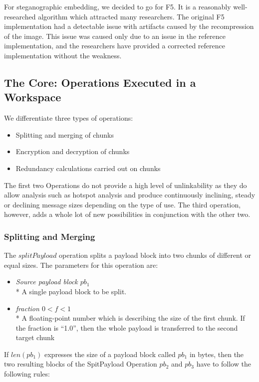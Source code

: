\documentclass[10pt,journal,compsoc,twocolumn,twoside]{IEEEtran}
\begin{document}
For steganographic embedding, we decided to go for F5\cite{f5}. It is a reasonably well-researched algorithm which attracted many researchers. The original F5 implementation had a detectable issue with artifacts\cite{F5broken} caused by the recompression of the image. This issue was caused only due to an issue in the reference implementation, and the researchers have provided a corrected reference implementation without the weakness. %

\subsection{The Core: Operations Executed in a Workspace}
We differentiate three types of operations:
\begin{itemize}
	\item Splitting and merging of chunks
	\item Encryption and decryption of chunks
	\item Redundancy calculations carried out on chunks
\end{itemize}

The first two Operations do not provide a high level of unlinkability as they do allow analysis such as hotspot analysis and produce continuously inclining, steady or declining message sizes depending on the type of use. The third operation, however, adds a whole lot of new possibilities in conjunction with the other two.

\subsubsection{Splitting and Merging}
The $splitPayload$ operation splits a payload block into two chunks of different or equal sizes. The parameters for this operation are:

\begin{itemize}
	\item \emph{Source payload block $pb_1$}\\*
	A single payload block to be split.
	\item \emph{fraction $0<f<1$}\\*
	A floating-point number which is describing the size of the first chunk. If the fraction is ``1.0'', then the whole payload is transferred to the second target chunk
\end{itemize}

If $len(pb_1)$ expresses the size of a payload block called $pb_1$ in bytes, then the two resulting blocks of the SpitPayload Operation $pb_2$ and $pb_3$ have to follow the following rules:
\end{document}
